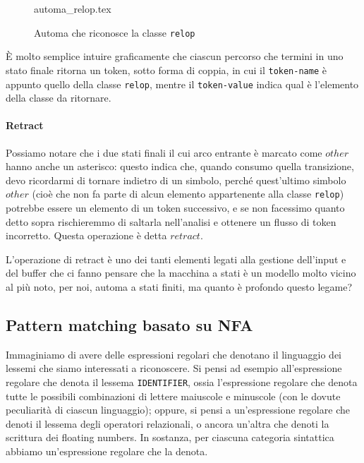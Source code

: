 \documentclass[class=book, crop=false, oneside, 12pt]{standalone}
\begin{document}
\begin{figure}[H]
    \centering
    {automa_relop.tex}
    \caption{Automa che riconosce la classe \texttt{relop}}
    \label{automaton-relop}
\end{figure}


È molto semplice intuire graficamente che ciascun percorso che termini in uno stato finale ritorna un token, sotto forma di coppia, in cui il \texttt{token-name} è appunto quello della classe \texttt{relop}, mentre il \texttt{token-value} indica qual è l'elemento della classe da ritornare.

\paragraph{Retract}
Possiamo notare che i due stati finali il cui arco entrante è marcato come \(other\) hanno anche un asterisco: questo indica che, quando consumo quella transizione, devo ricordarmi di tornare indietro di un simbolo, perché quest'ultimo simbolo \(other\) (cioè che non fa parte di alcun elemento appartenente alla classe \texttt{relop}) potrebbe essere un elemento di un token successivo, e se non facessimo quanto detto sopra rischieremmo di saltarla nell'analisi e ottenere un flusso di token incorretto. Questa operazione è detta \(retract\).

L'operazione di retract è uno dei tanti elementi legati alla gestione dell'input e del buffer che ci fanno pensare che la macchina a stati è un modello molto vicino al più noto, per noi, automa a stati finiti, ma quanto è profondo questo legame?

\subsection{Pattern matching basato su NFA}
Immaginiamo di avere delle espressioni regolari che denotano il linguaggio dei lessemi che siamo interessati a riconoscere. Si pensi ad esempio all'espressione regolare che denota il lessema \texttt{IDENTIFIER}, ossia l'espressione regolare che denota tutte le possibili combinazioni di lettere maiuscole e minuscole (con le dovute peculiarità di ciascun linguaggio); oppure, si pensi a un'espressione regolare che denoti il lessema degli operatori relazionali, o ancora un'altra che denoti la scrittura dei floating numbers. In sostanza, per ciascuna categoria sintattica abbiamo un'espressione regolare che la denota.
\end{document}
